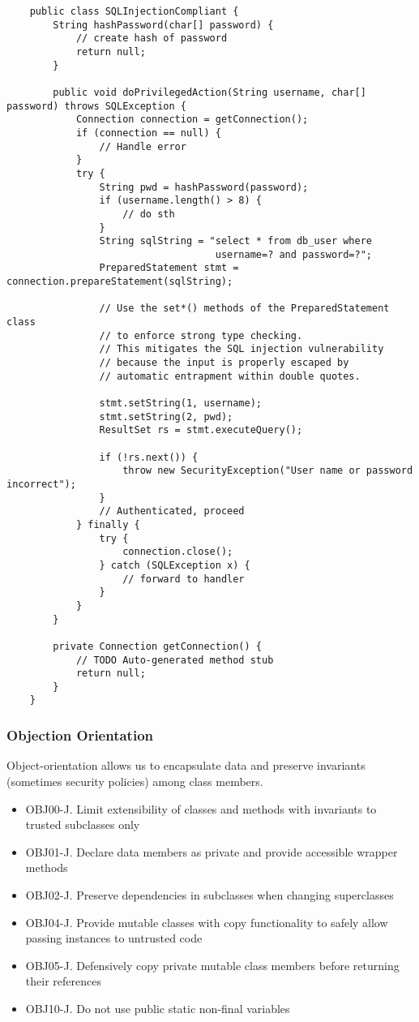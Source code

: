 \documentclass[a4paper]{article}
\begin{document}
\begin{verbatim}
	public class SQLInjectionCompliant {
		String hashPassword(char[] password) {
			// create hash of password
			return null;
		}
	
		public void doPrivilegedAction(String username, char[] password) throws SQLException {
			Connection connection = getConnection();
			if (connection == null) {
				// Handle error
			}
			try {
				String pwd = hashPassword(password);
				if (username.length() > 8) {
					// do sth
				}
				String sqlString = "select * from db_user where 
									username=? and password=?";
				PreparedStatement stmt = connection.prepareStatement(sqlString);
		
				// Use the set*() methods of the PreparedStatement class 
				// to enforce strong type checking.
				// This mitigates the SQL injection vulnerability 
				// because the input is properly escaped by
				// automatic entrapment within double quotes.
		
				stmt.setString(1, username);
				stmt.setString(2, pwd);
				ResultSet rs = stmt.executeQuery();
		
				if (!rs.next()) {
					throw new SecurityException("User name or password incorrect");
				}
				// Authenticated, proceed
			} finally {
				try {
					connection.close();
				} catch (SQLException x) {
					// forward to handler
				}
			}
		}
		
		private Connection getConnection() {
			// TODO Auto-generated method stub
			return null;
		}
	}
\end{verbatim}
\subsubsection{Objection Orientation}
Object-orientation allows us to encapsulate data and preserve invariants (sometimes security policies) among class members.
\begin{displayquote}
	\begin{itemize}
		\item OBJ00-J. Limit extensibility of classes and methods with invariants to trusted subclasses only
		\item OBJ01-J. Declare data members as private and provide accessible wrapper methods
		\item OBJ02-J. Preserve dependencies in subclasses when changing superclasses
		\item OBJ04-J. Provide mutable classes with copy functionality to safely allow passing instances to untrusted code
		\item OBJ05-J. Defensively copy private mutable class members before returning their references
		\item OBJ10-J. Do not use public static non-final variables
	\end{itemize}
\end{displayquote}
\end{document}
